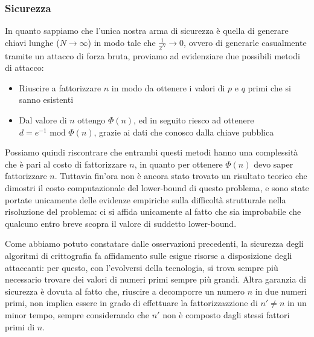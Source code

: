 \subsubsection{Sicurezza}
In quanto sappiamo che l'unica nostra arma di sicurezza è quella di generare
chiavi lunghe ($N\to\infty$) in modo tale che $\frac{1}{2^N}\to0$, ovvero
di generarle casualmente tramite un attacco di forza bruta, proviamo ad 
evidenziare due possibili metodi di attacco:
\begin{itemize}
\item Riuscire a fattorizzare $n$ in modo da ottenere i valori di $p$ e $q$ primi
      che si sanno esistenti
\item Dal valore di $n$ ottengo $\Phi(n)$, ed in seguito riesco ad ottenere
      $d=e^{-1}\text{ mod } \Phi(n)$, grazie ai dati che conosco dalla chiave
      pubblica
\end{itemize}
Possiamo quindi riscontrare che entrambi questi metodi hanno una complessità che
è pari al costo di fattorizzare $n$, in quanto per ottenere $\Phi(n)$ devo saper
fattorizzare $n$. Tuttavia fin'ora non è ancora stato trovato un risultato
teorico che dimostri il costo computazionale del lower-bound di questo problema,
e sono state portate unicamente delle evidenze empiriche sulla difficoltà
strutturale nella risoluzione del problema: ci si affida unicamente al fatto che
sia improbabile che qualcuno entro breve scopra il valore di suddetto lower-bound.

Come abbiamo potuto constatare dalle osservazioni precedenti, la sicurezza degli
algoritmi di crittografia fa affidamento sulle esigue risorse a disposizione
degli attaccanti: per questo, con l'evolversi della tecnologia, si trova sempre
più necessario trovare dei valori di numeri primi sempre più grandi. Altra
garanzia di sicurezza è dovuta al fatto che, riuscire a decomporre un numero $n$
in due numeri primi, non implica essere in grado di effettuare la fattorizzazzione
di $n'\neq n$ in un minor tempo, sempre considerando che $n'$ non è composto
dagli stessi fattori primi di $n$. 

